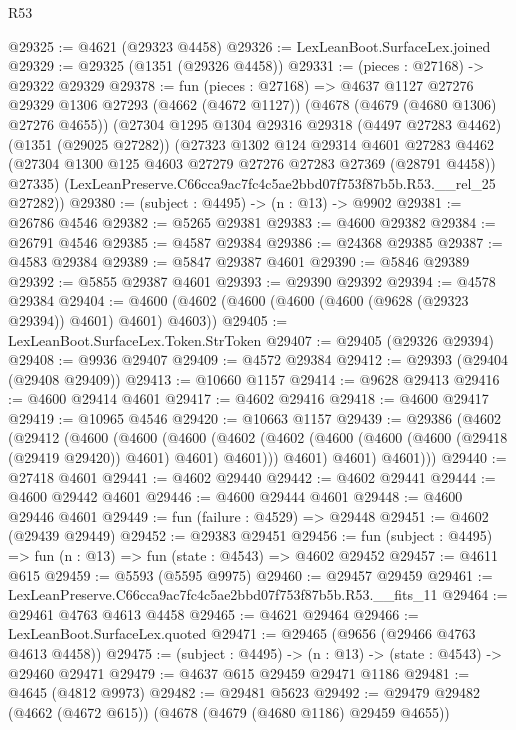 \begin{lexlean}{R53}
\begin{coremodule}
@29325 := @4621 (@29323 @4458)
@29326 := LexLeanBoot.SurfaceLex.joined
@29329 := @29325 (@1351 (@29326 @4458))
@29331 := (pieces : @27168) -> @29322 @29329
@29378 := fun (pieces : @27168) =>
  @4637
    @1127
    @27276
    @29329
    @1306
    @27293
    (@4662 (@4672 @1127))
    (@4678 (@4679 (@4680 @1306) @27276 @4655))
    (@27304
      @1295
      @1304
      @29316
      @29318
      (@4497 @27283 @4462)
      (@1351 (@29025 @27282))
      (@27323
        @1302
        @124
        @29314
        @4601
        @27283
        @4462
        (@27304 @1300 @125 @4603 @27279 @27276 @27283 @27369 (@28791 @4458))
        @27335)
      (LexLeanPreserve.C66cca9ac7fc4c5ae2bbd07f753f87b5b.R53.__rel_25 @27282))
@29380 := (subject : @4495) -> (n : @13) -> @9902
@29381 := @26786 @4546
@29382 := @5265 @29381
@29383 := @4600 @29382
@29384 := @26791 @4546
@29385 := @4587 @29384
@29386 := @24368 @29385
@29387 := @4583 @29384
@29389 := @5847 @29387 @4601
@29390 := @5846 @29389
@29392 := @5855 @29387 @4601
@29393 := @29390 @29392
@29394 := @4578 @29384
@29404 := @4600 (@4602 (@4600 (@4600 (@4600 (@9628 (@29323 @29394)) @4601) @4601) @4603))
@29405 := LexLeanBoot.SurfaceLex.Token.StrToken
@29407 := @29405 (@29326 @29394)
@29408 := @9936 @29407
@29409 := @4572 @29384
@29412 := @29393 (@29404 (@29408 @29409))
@29413 := @10660 @1157
@29414 := @9628 @29413
@29416 := @4600 @29414 @4601
@29417 := @4602 @29416
@29418 := @4600 @29417
@29419 := @10965 @4546
@29420 := @10663 @1157
@29439 := @29386
    (@4602
      (@29412
        (@4600
          (@4600
            (@4600
              (@4602 (@4602 (@4600 (@4600 (@4600 (@29418 (@29419 @29420)) @4601) @4601) @4601)))
              @4601)
            @4601)
          @4601)))
@29440 := @27418 @4601
@29441 := @4602 @29440
@29442 := @4602 @29441
@29444 := @4600 @29442 @4601
@29446 := @4600 @29444 @4601
@29448 := @4600 @29446 @4601
@29449 := fun (failure : @4529) => @29448
@29451 := @4602 (@29439 @29449)
@29452 := @29383 @29451
@29456 := fun (subject : @4495) => fun (n : @13) => fun (state : @4543) => @4602 @29452
@29457 := @4611 @615
@29459 := @5593 (@5595 @9975)
@29460 := @29457 @29459
@29461 := LexLeanPreserve.C66cca9ac7fc4c5ae2bbd07f753f87b5b.R53.__fits_11
@29464 := @29461 @4763 @4613 @4458
@29465 := @4621 @29464
@29466 := LexLeanBoot.SurfaceLex.quoted
@29471 := @29465 (@9656 (@29466 @4763 @4613 @4458))
@29475 := (subject : @4495) -> (n : @13) -> (state : @4543) -> @29460 @29471
@29479 := @4637 @615 @29459 @29471 @1186
@29481 := @4645 (@4812 @9973)
@29482 := @29481 @5623
@29492 := @29479 @29482 (@4662 (@4672 @615)) (@4678 (@4679 (@4680 @1186) @29459 @4655))

\end{coremodule}
\end{lexlean}
